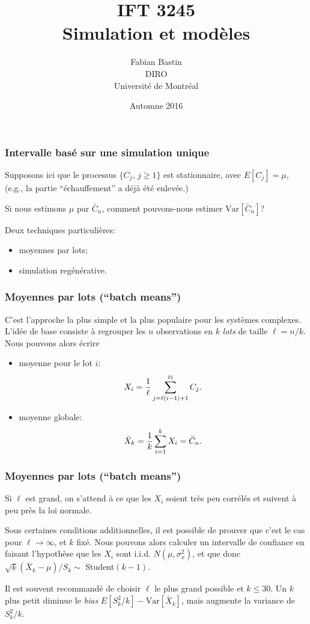 \documentclass[t,usepdftitle=false]{beamer}
\title[IFT3245]{IFT 3245\\Simulation et modèles}
\author[Fabian Bastin]{Fabian Bastin\\DIRO\\Université de Montréal}
\date{Automne 2016}
\def\Var{\mbox{Var}}
\def\iid{i.i.d.}
\begin{document}
\frame{\titlepage}

\begin{frame}
\frametitle{Intervalle basé sur une simulation unique}

Supposons ici que le processus $\{{C_j},\, j\ge 1\}$ est stationnaire,
avec $E[C_j]={\mu}$, (e.g., la partie ``échauffement'' a déjà
été enlevée.)

\mbox{}

Si nous estimons $\mu$ par $\bar C_n$, comment pouvons-nous estimer $\Var[\bar C_n]$?

\mbox{}

Deux techniques particulières:
\begin{itemize}
\item
moyennes par lots;
\item
simulation regénérative.
\end{itemize}

\end{frame}

\begin{frame}
\frametitle{Moyennes par lots (``batch means'')}

C'est l'approche la plus simple et la plus populaire pour les
systèmes complexes.
L'idée de base consiste à regrouper les ${n}$ observations en ${k}$
\emph{lots} de taille ${\ell} = n/k$.
Nous pouvons alors écrire
\begin{itemize}
\item
moyenne pour le lot $i$:
$$
  {X_i} = {1\over \ell} \sum_{j=\ell (i-1)+1}^{\ell i} C_j.
$$
\item
moyenne globale:
$$
 {\bar X_k} = {1\over k} \sum_{i=1}^k X_i = \bar C_n.
$$
\end{itemize}

\end{frame}

\begin{frame}
\frametitle{Moyennes par lots (``batch means'')}

Si $\ell$ est grand, on s'attend à ce que les $X_i$ soient très 
peu corrélés et suivent à peu près la loi normale.

\mbox{}


Sous certaines conditions additionnelles, il est possible de prouver
que c'est le cas pour $\ell \rightarrow \infty$, et $k$ fixé.
Nous pouvons alors calculer un intervalle de confiance en faisant
l'hypothèse que les $X_i$ sont \iid{} $N(\mu, \sigma_x^2)$,
et que donc $\sqrt{k}(\bar X_k - \mu)/ S_k \sim$ Student$(k-1)$.

\mbox{}

Il est souvent recommandé de choisir $\ell$ le plus grand possible
et $k\le 30$.
Un $k$ plus petit diminue le \emph{bias} $E[S_k^2/k] - \Var[\bar X_k]$,
mais augmente la variance de $S_k^2/k$.

\end{frame}
\end{document}
